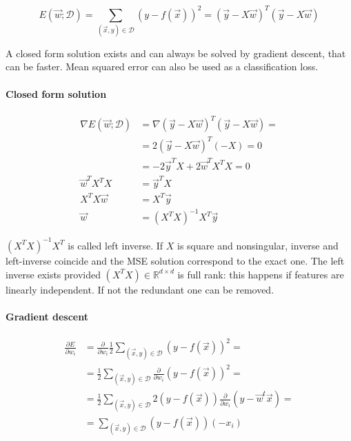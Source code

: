 		$$E(\vec{w};\mathcal{D}) = \sum\limits_{(\vec{x},y)\in\mathcal{D}}(y-f(\vec{x}))^2 = (\vec{y}-X\vec{w})^T(\vec{y}-X\vec{w})$$

		A closed form solution exists and can always be solved by gradient descent, that can be faster.
		Mean squared error can also be used as a classification loss.

			\paragraph{Closed form solution}

			\begin{align*}
				\nabla E(\vec{w};\mathcal{D}) & = \nabla(\vec{y}-X\vec{w})^T(\vec{y}-X\vec{w})=\\
																			&= 2(\vec{y}-X\vec{w})^T(-X) = 0\\
																			&= -2\vec{y}^TX+2\vec{w}^TX^TX = 0\\
				\vec{w}^TX^TX &=\vec{y}^TX\\
				X^TX\vec{w} &= X^T\vec{y}\\
				\vec{w} &= (X^TX)^{-1}X^T\vec{y}
			\end{align*}

			$(X^TX)^{-1}X^T$ is called left inverse.
			If $X$ is square and nonsingular, inverse and left-inverse coincide and the MSE solution correspond to the exact one.
			The left inverse exists provided $(X^TX)\in\mathbb{R}^{d\times d}$ is full rank: this happens if features are linearly independent.
			If not the redundant one can be removed.

			\paragraph{Gradient descent}

			\begin{align*}
				\frac{\partial E}{\partial w_i} &=\frac{\partial}{\partial w_i}\frac{1}{2}\sum\limits_{(\vec{x},y)\in\mathcal{D}}(y-f(\vec{x}))^2=\\
																				&=\frac{1}{2}\sum\limits_{(\vec{x},y)\in\mathcal{D}}\frac{\partial}{\partial w_i}(y-f(\vec{x}))^2=\\
																				&=\frac{1}{2}\sum\limits_{(\vec{x},y)\in\mathcal{D}}2(y-f(\vec{x}))\frac{\partial}{\partial w_i}(y-\vec{w}^t\vec{x})=\\
																				&=\sum\limits_{(\vec{x}, y)\in\mathcal{D}}(y-f(\vec{x}))(-x_i)
			\end{align*}

